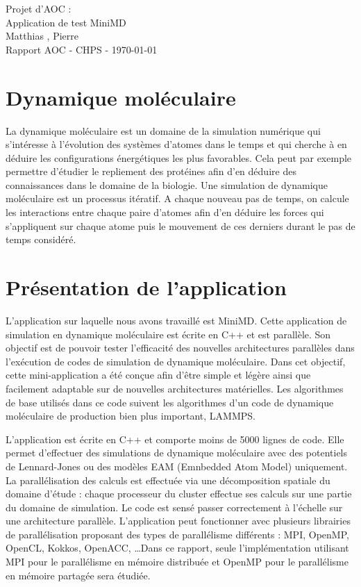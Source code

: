 \documentclass[11pt,a4paper]{article}
\begin{document}
\begin{center}

	{\LARGE\centering Projet d'AOC :\\ Application de test MiniMD}\\[1cm]

	{ Matthias , Pierre }\\[0.5cm]
	{Rapport AOC - CHPS - \today}\\[2cm]
\end{center}

\tableofcontents
\newpage

\section{Dynamique moléculaire}
	La dynamique moléculaire est un domaine de la simulation numérique qui s'intéresse à l'évolution des systèmes d'atomes dans le temps et qui cherche à en déduire les configurations énergétiques les plus favorables. Cela peut par exemple permettre d'étudier le repliement des protéines afin d'en déduire des connaissances dans le domaine de la biologie.
	Une simulation de dynamique moléculaire est un processus itératif. A chaque nouveau pas de temps, on calcule les interactions entre chaque paire d'atomes afin d'en déduire les forces qui s'appliquent sur chaque atome puis le mouvement de ces derniers durant le pas de temps considéré.

\section{Présentation de l'application}
	L'application sur laquelle nous avons travaillé est MiniMD. Cette application de simulation en dynamique moléculaire est écrite en C++ et est parallèle. Son objectif est de pouvoir tester l'efficacité des nouvelles architectures parallèles dans l'exécution de codes de simulation de dynamique moléculaire. Dans cet objectif, cette mini-application a été conçue afin d'être simple et légère ainsi que facilement adaptable sur de nouvelles architectures matérielles. Les algorithmes de base utilisés dans ce code suivent les algorithmes d'un code de dynamique moléculaire de production bien plus important, LAMMPS.

	L'application est écrite en C++ et comporte moins de 5000 lignes de code. Elle permet d'effectuer des simulations de dynamique moléculaire avec des potentiels de Lennard-Jones ou des modèles EAM (Emnbedded Atom Model) uniquement. La parallélisation des calculs est effectuée via une décomposition spatiale du domaine d'étude : chaque processeur du cluster effectue ses calculs sur une partie du domaine de simulation. Le code est sensé passer correctement à l'échelle  sur une architecture parallèle. L'application peut fonctionner avec plusieurs librairies de parallélisation proposant des types de parallélisme différents : MPI, OpenMP, OpenCL, Kokkos, OpenACC, \ldots Dans ce rapport, seule l'implémentation utilisant MPI pour le parallélisme en mémoire distribuée et OpenMP pour le parallélisme en mémoire partagée sera étudiée.
\end{document}
